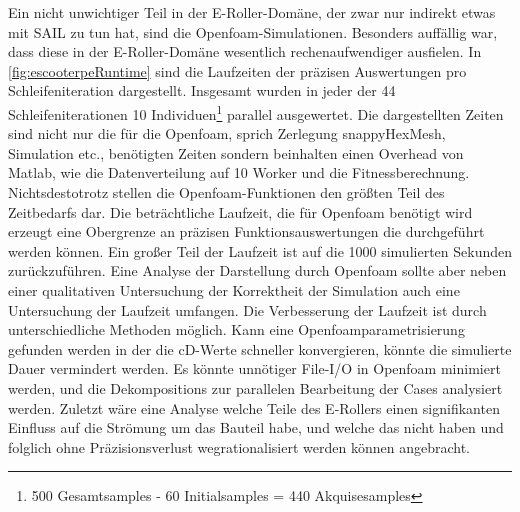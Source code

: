 Ein nicht unwichtiger Teil in der E-Roller-Domäne, der zwar nur indirekt etwas mit SAIL zu tun hat, sind die Openfoam-Simulationen.
Besonders auffällig war, dass diese in der E-Roller-Domäne wesentlich rechenaufwendiger ausfielen.
In \cref{fig:escooterpeRuntime} sind die Laufzeiten der präzisen Auswertungen pro Schleifeniteration dargestellt.
Insgesamt wurden in jeder der 44 Schleifeniterationen 10 Individuen\footnote{500 Gesamtsamples - 60 Initialsamples = 440 Akquisesamples} parallel ausgewertet.
Die dargestellten Zeiten sind nicht nur die für die Openfoam, sprich Zerlegung snappyHexMesh, Simulation etc., benötigten Zeiten sondern beinhalten einen Overhead von Matlab, wie die Datenverteilung auf 10 Worker und die Fitnessberechnung.
Nichtsdestotrotz stellen die Openfoam-Funktionen den größten Teil des Zeitbedarfs dar.
Die beträchtliche Laufzeit, die für Openfoam benötigt wird erzeugt eine Obergrenze an präzisen Funktionsauswertungen die durchgeführt werden können.
Ein großer Teil der Laufzeit ist auf die 1000 simulierten Sekunden zurückzuführen.
Eine Analyse der Darstellung durch Openfoam sollte aber neben einer qualitativen Untersuchung der Korrektheit der Simulation auch eine Untersuchung der Laufzeit umfangen.
Die Verbesserung der Laufzeit ist durch unterschiedliche Methoden möglich.
Kann eine Openfoamparametrisierung gefunden werden in der die cD-Werte schneller konvergieren, könnte die simulierte Dauer vermindert werden.
Es könnte unnötiger File-I/O in Openfoam minimiert werden, und die Dekompositions zur parallelen Bearbeitung der Cases analysiert werden.
Zuletzt wäre eine Analyse welche Teile des E-Rollers einen signifikanten Einfluss auf die Strömung um das Bauteil habe, und welche das nicht haben und folglich ohne Präzisionsverlust wegrationalisiert werden können angebracht.


